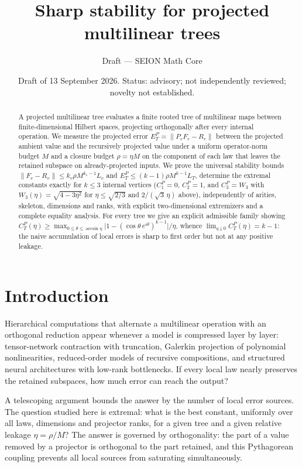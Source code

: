 \documentclass[11pt]{amsart}
\title[Sharp stability for projected multilinear trees]{Sharp stability for projected multilinear trees}
\author{Draft --- SEION Math Core}
\date{Draft of 13 September 2026. Status: advisory; not independently reviewed; novelty not established.}
\theoremstyle{definition}
\newcommand{\norm}[1]{\lVert #1\rVert}
\begin{document}
\begin{abstract}
A projected multilinear tree evaluates a finite rooted tree of multilinear maps
between finite-dimensional Hilbert spaces, projecting orthogonally after every
internal operation. We measure the projected error $E^P_T=\norm{P_rF_r-R_r}$
between the projected ambient value and the recursively projected value under a
uniform operator-norm budget $M$ and a closure budget $\rho=\eta M$ on the
component of each law that leaves the retained subspace on already-projected
inputs. We prove the universal stability bounds
$\norm{F_v-R_v}\le k_v\rho M^{k_v-1}L_v$ and $E^P_T\le(k-1)\rho M^{k-1}L_T$,
determine the extremal constants exactly for $k\le 3$ internal vertices
($C_1^P=0$, $C_2^P=1$, and $C_3^P=W_3$ with
$W_3(\eta)=\sqrt{4-3\eta^2}$ for $\eta\le\sqrt{2/3}$ and $2/(\sqrt3\,\eta)$
above), independently of arities, skeleton, dimensions and ranks, with explicit
two-dimensional extremizers and a complete equality analysis. For every tree we
give an explicit admissible family showing
$C^P_T(\eta)\ge\max_{0\le\theta\le\arcsin\eta}\lvert 1-(\cos\theta\,e^{i\theta})^{k-1}\rvert/\eta$,
whence $\lim_{\eta\downarrow0}C_T^P(\eta)=k-1$: the naive accumulation of local
errors is sharp to first order but not at any positive leakage.
\end{abstract}

\maketitle

\section{Introduction}

Hierarchical computations that alternate a multilinear operation with an
orthogonal reduction appear whenever a model is compressed layer by layer:
tensor-network contraction with truncation, Galerkin projection of polynomial
nonlinearities, reduced-order models of recursive compositions, and structured
neural architectures with low-rank bottlenecks. If every local law nearly
preserves the retained subspaces, how much error can reach the output?

A telescoping argument bounds the answer by the number of local error sources.
The question studied here is extremal: what is the best constant, uniformly over
all laws, dimensions and projector ranks, for a given tree and a given relative
leakage $\eta=\rho/M$? The answer is governed by orthogonality: the part of a
value removed by a projector is orthogonal to the part retained, and this
Pythagorean coupling prevents all local sources from saturating simultaneously.
\end{document}
